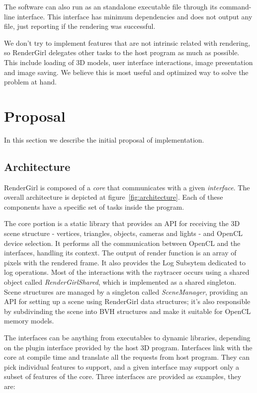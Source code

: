 \documentclass[a4paper]{sbgames}               %
\begin{document}
The software can also run as an standalone executable file through its
command-line interface. This interface has minimum dependencies and
does not output any file, just reporting if the rendering was successful.

We don't try to implement features that are not intrinsic related with
rendering, so RenderGirl delegates other tasks to the host program as
much as possible. This include loading of 3D models, user interface
interactions, image presentation and image saving. We believe this is
most useful and optimized way to solve the problem at hand.

\section{Proposal}

In this section we describe the initial proposal of implementation.

\subsection{Architecture}

RenderGirl is composed of a \emph{core} that communicates with a given
\emph{interface}. The overall architecture is depicted at figure~\ref{fig:architecture}. Each of these components have a specific set
of tasks inside the program.

The core portion is a static library that provides an API for
receiving the 3D scene structure - vertices, triangles, objects,
cameras and lights - and OpenCL device selection. It performs all the
communication between OpenCL and the interfaces, handling its
context. The output of render function is an array of pixels with the
rendered frame. It also provides the Log Subsytem dedicated to log
operations. Most of the interactions with the raytracer occurs using a
shared object called \emph{RenderGirlShared}, which is implemented as
a shared singleton. Scene structures are managed by a singleton called
\emph{SceneManager}, providing an API for setting up a scene using
RenderGirl data structures; it's also responsible by subdivinding the
scene into BVH structures and make it suitable for OpenCL memory
models.


The interfaces can be anything from executables to dynamic libraries,
depending on the plugin interface provided by the host 3D
program. Interfaces link with the core at compile time and translate
all the requests from host program. They can pick individual features
to support, and a given interface may support only a subset of
features of the core. Three interfaces are provided as examples, they
are:
\end{document}
